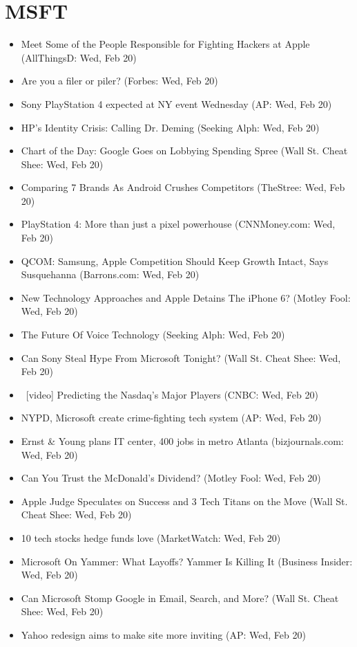 \documentclass[11pt,asymmetric]{article}
\begin{document}
\section*{MSFT}
\begin{itemize}
\item Meet Some of the People Responsible for Fighting Hackers at Apple (AllThingsD: Wed, Feb 20)
\item Are you a filer or piler? (Forbes: Wed, Feb 20)
\item Sony PlayStation 4 expected at NY event Wednesday (AP: Wed, Feb 20)
\item HP's Identity Crisis: Calling Dr. Deming (Seeking Alph: Wed, Feb 20)
\item Chart of the Day: Google Goes on Lobbying Spending Spree (Wall St. Cheat Shee: Wed, Feb 20)
\item Comparing 7 Brands As Android Crushes Competitors (TheStree: Wed, Feb 20)
\item PlayStation 4: More than just a pixel powerhouse (CNNMoney.com: Wed, Feb 20)
\item QCOM: Samsung, Apple Competition Should Keep Growth Intact, Says Susquehanna (Barrons.com: Wed, Feb 20)
\item New Technology Approaches and Apple Detains The iPhone 6? (Motley Fool: Wed, Feb 20)
\item The Future Of Voice Technology (Seeking Alph: Wed, Feb 20)
\item Can Sony Steal Hype From Microsoft Tonight? (Wall St. Cheat Shee: Wed, Feb 20)
\item\ [video] Predicting the Nasdaq's Major Players (CNBC: Wed, Feb 20)
\item NYPD, Microsoft create crime-fighting tech system (AP: Wed, Feb 20)
\item Ernst \& Young plans IT center, 400 jobs in metro Atlanta (bizjournals.com: Wed, Feb 20)
\item Can You Trust the McDonald's Dividend? (Motley Fool: Wed, Feb 20)
\item Apple Judge Speculates on Success and 3 Tech Titans on the Move (Wall St. Cheat Shee: Wed, Feb 20)
\item 10 tech stocks hedge funds love (MarketWatch: Wed, Feb 20)
\item Microsoft On Yammer: What Layoffs? Yammer Is Killing It (Business Insider: Wed, Feb 20)
\item Can Microsoft Stomp Google in Email, Search, and More? (Wall St. Cheat Shee: Wed, Feb 20)
\item Yahoo redesign aims to make site more inviting (AP: Wed, Feb 20)

\end{itemize}
\end{document}
